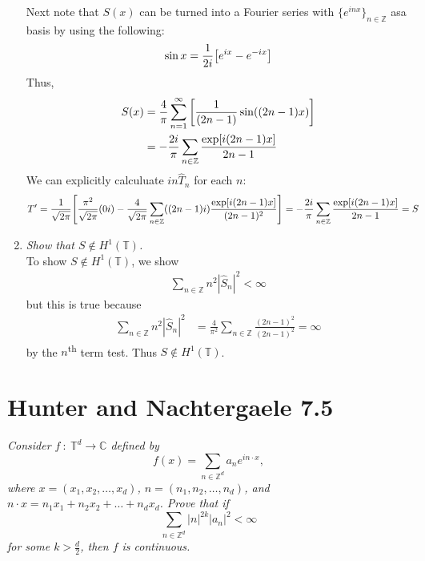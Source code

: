 \documentclass[paper=a4, fontsize=11pt]{scrartcl} %
\theoremstyle{plain}
\numberwithin{equation}{section} %
\numberwithin{figure}{section} %
\numberwithin{table}{section} %
\begin{document}
\begin{enumerate}[\bf (a)]
        Next note that $S(x)$ can be turned into a Fourier series with $\{e^{inx}\}_{n\in\mathbb{Z}}$ asa basis by using the following:
        \begin{align*}
            \sin x = \frac{1}{2i}\qty[e^{ix} - e^{-ix}]
        \end{align*}
        Thus,
        \begin{align*}
            S(x) &= \frac{4}{\pi}\sum_{n=1}^\infty\qty[\frac{1}{(2n-1)}\sin((2n-1)x)] \\
            &= -\frac{2i}{\pi}\sum_{n\in\mathbb{Z}}\frac{\exp[i(2n-1)x]}{2n-1}
        \end{align*}
        We can explicitly calculuate $in\hat{T}_n$ for each $n$:
        \begin{align*}
            T' = \frac{1}{\sqrt{2\pi}}\qty[\frac{\pi^2}{\sqrt{2\pi}}(0i) - \frac{4}{\sqrt{2\pi}}\sum_{n\in\mathbb{Z}}((2n-1)i)\frac{\exp[i(2n-1)x]}{(2n-1)^2}] &= -\frac{2i}{\pi}\sum_{n\in\mathbb{Z}}\frac{\exp[i(2n-1)x]}{2n-1} = S
        \end{align*}
    \item
        \emph{Show that $S \not\in H^1(\mathbb{T})$.} \\

        To show $S \not\in H^1(\mathbb{T})$, we show
        \begin{align*}
            \sum_{n\in\mathbb{Z}} n^2 |\hat{S}_n|^2 < \infty
        \end{align*}
        but this is true because
        \begin{align*}
            \sum_{n\in\mathbb{Z}} n^2 |\hat{S}_n|^2 &= \frac{4}{\pi^2}\sum_{n\in\mathbb{Z}} \frac{(2n-1)^2}{(2n-1)^2} = \infty
        \end{align*}
        by the $n$\textsuperscript{th} term test.  Thus $S \not\in H^1(\mathbb{T})$.
\end{enumerate}

\section{Hunter and Nachtergaele 7.5}
\emph{Consider $f\ :\ \mathbb{T}^d \rightarrow \mathbb{C}$ defined by $$f(x) = \sum_{n\in\mathbb{Z}^d}a_n e^{i n \cdot x},$$ where $x = (x_1, x_2, \dots, x_d)$, $n = (n_1, n_2, \dots, n_d)$, and $n\cdot x = n_1x_1 + n_2x_2 + \dots + n_dx_d$.  Prove that if $$\sum_{n\in\mathbb{Z}^d}|n|^{2k}|a_n|^2 <\infty$$ for some $k > \frac{d}{2}$, then $f$ is continuous.} \\
\end{document}
